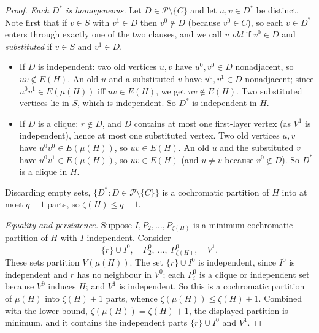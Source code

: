 \documentclass[11pt,a4paper]{article}
\theoremstyle{plain}
\theoremstyle{definition}
\theoremstyle{remark}
\newcommand{\myc}{\mu}
\newcommand{\cP}{\mathcal P}
\begin{document}
\begin{proof}
\emph{Each $D^*$ is homogeneous.} Let $D\in\cP\setminus\{C\}$ and let $u,v\in D^*$ be distinct. Note first that if $v\in S$ with $v^1\in D$ then $v^0\notin D$ (because $v^0\in C$), so each $v\in D^*$ enters through exactly one of the two clauses, and we call $v$ \emph{old} if $v^0\in D$ and \emph{substituted} if $v\in S$ and $v^1\in D$.
\begin{itemize}[nosep]
\item If $D$ is independent: two old vertices $u,v$ have $u^0,v^0\in D$ nonadjacent, so $uv\notin E(H)$. An old $u$ and a substituted $v$ have $u^0,v^1\in D$ nonadjacent; since $u^0v^1\in E(\myc(H))$ iff $uv\in E(H)$, we get $uv\notin E(H)$. Two substituted vertices lie in $S$, which is independent. So $D^*$ is independent in $H$.
\item If $D$ is a clique: $r\notin D$, and $D$ contains at most one first-layer vertex (as $V^1$ is independent), hence at most one substituted vertex. Two old vertices $u,v$ have $u^0v^0\in E(\myc(H))$, so $uv\in E(H)$. An old $u$ and the substituted $v$ have $u^0v^1\in E(\myc(H))$, so $uv\in E(H)$ (and $u\ne v$ because $v^0\notin D$). So $D^*$ is a clique in $H$.
\end{itemize}
Discarding empty sets, $\{D^*:D\in\cP\setminus\{C\}\}$ is a cochromatic partition of $H$ into at most $q-1$ parts, so $\zeta(H)\le q-1$.

\emph{Equality and persistence.} Suppose $I,P_2,\dots,P_{\zeta(H)}$ is a minimum cochromatic partition of $H$ with $I$ independent. Consider
\[
\{r\}\cup I^0,\quad P_2^0,\ \dots,\ P_{\zeta(H)}^0,\quad V^1 .
\]
These sets partition $V(\myc(H))$. The set $\{r\}\cup I^0$ is independent, since $I^0$ is independent and $r$ has no neighbour in $V^0$; each $P_i^0$ is a clique or independent set because $V^0$ induces $H$; and $V^1$ is independent. So this is a cochromatic partition of $\myc(H)$ into $\zeta(H)+1$ parts, whence $\zeta(\myc(H))\le\zeta(H)+1$. Combined with the lower bound, $\zeta(\myc(H))=\zeta(H)+1$, the displayed partition is minimum, and it contains the independent parts $\{r\}\cup I^0$ and $V^1$.
\end{proof}
\end{document}

